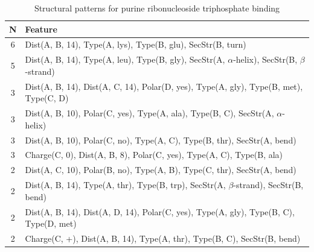\documentclass[11pt,twoside,a4paper]{book}
\begin{document}
\begin{table}\begin{tabularx}{\textwidth}{cX}\textbf{N} & \textbf{Feature} \\ \hline  
6 & Dist(A, B, 14),  Type(A, lys), Type(B, glu), SecStr(B, turn)\\ \hline 
5 & Dist(A, B, 14),  Type(A, leu), Type(B, gly), SecStr(A, $\alpha$-helix), SecStr(B, $\beta$-strand)\\ \hline 
3 & Dist(A, B, 14), Dist(A, C, 14), Polar(D, yes),  Type(A, gly), Type(B, met), \newline Type(C, D)\\ \hline 
3 & Dist(A, B, 10), Polar(C, yes),  Type(A, ala), Type(B, C), SecStr(A, $\alpha$-helix)\\ \hline 
3 & Dist(A, B, 10), Polar(C, no),  Type(A, C), Type(B, thr), SecStr(A, bend)\\ \hline 
3 & Charge(C, 0), Dist(A, B, 8), Polar(C, yes),  Type(A, C), Type(B, ala)\\ \hline 
2 & Dist(A, C, 10), Polar(B, no),  Type(A, B), Type(C, thr), SecStr(A, bend)\\ \hline 
2 & Dist(A, B, 14),  Type(A, thr), Type(B, trp), SecStr(A, $\beta$-strand), SecStr(B, bend)\\ \hline 
2 & Dist(A, B, 14), Dist(A, D, 14), Polar(C, yes),  Type(A, gly), Type(B, C), \newline Type(D, met)\\ \hline 
2 & Charge(C, +), Dist(A, B, 14),  Type(A, thr), Type(B, C), SecStr(B, bend)\\ \hline 
 \end{tabularx}\caption{Structural patterns for purine ribonucleoside triphosphate binding}\label{tab:purine_ribonucleoside_triphosphate_binding}\end{table}
\end{document}
